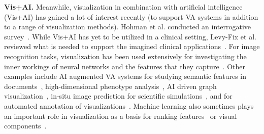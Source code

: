 

\vspace{1pt}
\noindent\textbf{Vis+AI.} Meanwhile, visualization in combination with artificial intelligence (Vis+AI) has gained a lot of interest recently (to support VA systems in addition to a range of visualization methods). Hohman et al. conducted an interrogative survey~\cite{8371286}.
While Vis+AI has yet to be utilized in a clinical setting, Levy-Fix et al. reviewed what is needed to support the imagined clinical applications~\cite{levy2019machine}. For image recognition tasks, visualization has been used extensively for investigating the inner workings of neural networks and the features that they capture~\cite{olah2017feature, 8022871, 8017583, 8827593}. Other examples include AI augmented VA systems for studying semantic features in documents~\cite{ji2019visual},  high-dimensional phenotype analysis~\cite{8827951}, AI driven graph visualization~\cite{8017580,8805452}, in-situ image prediction for scientific simulations~\cite{he2019insitunet}, and for automated annotation of visualizations~\cite{lai2020automatic}. Machine learning also sometimes plays an important role in visualization as a basis for ranking features~\cite{mumtaz2015visualisation,maniyar2006data} or visual components~\cite{10.1145/3126594.3126653}.




